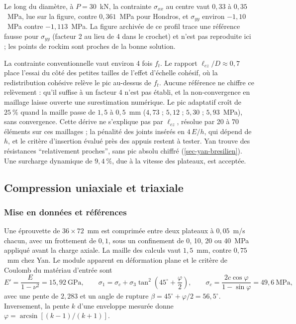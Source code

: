 Le long du diamètre, à $P = 30$~kN, la contrainte $\sigma_{xx}$ au centre vaut $0{,}33$ à $0{,}35$~MPa, lue sur la figure, contre $0{,}361$~MPa pour Hondros, et $\sigma_{yy}$ environ $-1{,}10$~MPa contre $-1{,}113$~MPa. La figure archivée de ce profil trace une référence fausse pour $\sigma_{yy}$ (facteur 2 au lieu de 4 dans le crochet) et n'est pas reproduite ici ; les points de rockim sont proches de la bonne solution.

La contrainte conventionnelle vaut environ 4 fois $f_t$. Le rapport $\ell_{cz}/D \approx 0{,}7$ place l'essai du côté des petites tailles de l'effet d'échelle cohésif, où la redistribution cohésive relève le pic au-dessus de $f_t$. Aucune référence ne chiffre ce relèvement : qu'il suffise à un facteur 4 n'est pas établi, et la non-convergence en maillage laisse ouverte une surestimation numérique. Le pic adaptatif croît de $25~\%$ quand la maille passe de $1{,}5$ à $0{,}5$~mm ($4{,}73$ ; $5{,}12$ ; $5{,}30$ ; $5{,}93$~MPa), sans convergence. Cette dérive ne s'explique pas par $\ell_{cz}$, résolue par 20 à 70 éléments sur ces maillages ; la pénalité des joints insérés en $4\,E/h$, qui dépend de $h$, et le critère d'insertion évalué près des appuis restent à tester. Yan trouve des résistances \enquote{relativement proches}, sans pic absolu chiffré (\cref{sec-yan-bresilien}). Une surcharge dynamique de $9{,}4~\%$, due à la vitesse des plateaux, est acceptée.

\subsection{Compression uniaxiale et triaxiale}

\subsubsection{Mise en données et références}

Une éprouvette de $36 \times 72$~mm est comprimée entre deux plateaux à $0{,}05$~m/s chacun, avec un frottement de $0{,}1$, sous un confinement de 0, 10, 20 ou 40~MPa appliqué avant la charge axiale. La maille des calculs vaut $1{,}5$~mm, contre $0{,}75$~mm chez Yan. Le module apparent en déformation plane et le critère de Coulomb du matériau d'entrée sont
\begin{equation}
E' = \frac{E}{1-\nu^2} = 15{,}92~\text{GPa}, \qquad
\sigma_1 = \sigma_c + \sigma_3\tan^2\!\left(45^\circ + \frac{\varphi}{2}\right), \qquad
\sigma_c = \frac{2c\cos\varphi}{1-\sin\varphi} = 49{,}6~\text{MPa},
\end{equation}
avec une pente de $2{,}283$ et un angle de rupture $\beta = 45^\circ + \varphi/2 = 56{,}5^\circ$. Inversement, la pente $k$ d'une enveloppe mesurée donne $\varphi = \arcsin[(k-1)/(k+1)]$.

